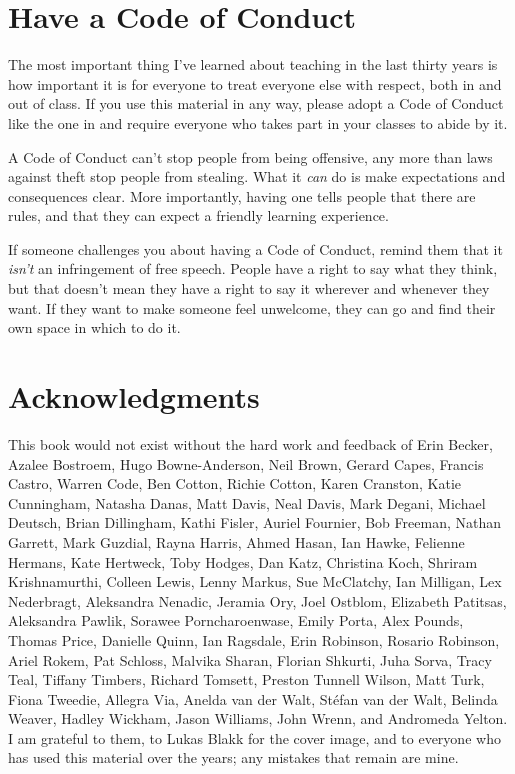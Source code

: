 \section{Have a Code of Conduct}\label{s:intro-code-of-conduct}

The most important thing I've learned about teaching in the last
thirty years is how important it is for everyone to treat everyone
else with respect, both in and out of class.  If you use this material
in any way, please adopt a Code of Conduct like the one in
 and require everyone who takes part in your classes
to abide by it.

A Code of Conduct can't stop people from being offensive, any more
than laws against theft stop people from stealing.  What it \emph{can}
do is make expectations and consequences clear.  More importantly,
having one tells people that there are rules, and that they can expect
a friendly learning experience.

If someone challenges you about having a Code of Conduct, remind them
that it \emph{isn't} an infringement of free speech.  People have a
right to say what they think, but that doesn't mean they have a right
to say it wherever and whenever they want.  If they want to make
someone feel unwelcome, they can go and find their own space in which
to do it.

\section{Acknowledgments}\label{s:intro-acknowledgments}

This book would not exist without the hard work and feedback of Erin
Becker, Azalee Bostroem, Hugo Bowne-Anderson, Neil Brown, Gerard
Capes, Francis Castro, Warren Code, Ben Cotton, Richie Cotton, Karen
Cranston, Katie Cunningham, Natasha Danas, Matt Davis, Neal Davis,
Mark Degani, Michael Deutsch, Brian Dillingham, Kathi Fisler, Auriel
Fournier, Bob Freeman, Nathan Garrett, Mark Guzdial, Rayna Harris,
Ahmed Hasan, Ian Hawke, Felienne Hermans, Kate Hertweck, Toby Hodges,
Dan Katz, Christina Koch, Shriram Krishnamurthi, Colleen Lewis, Lenny
Markus, Sue McClatchy, Ian Milligan, Lex Nederbragt, Aleksandra
Nenadic, Jeramia Ory, Joel Ostblom, Elizabeth Patitsas, Aleksandra
Pawlik, Sorawee Porncharoenwase, Emily Porta, Alex Pounds, Thomas
Price, Danielle Quinn, Ian Ragsdale, Erin Robinson, Rosario Robinson,
Ariel Rokem, Pat Schloss, Malvika Sharan, Florian Shkurti, Juha Sorva,
Tracy Teal, Tiffany Timbers, Richard Tomsett, Preston Tunnell Wilson,
Matt Turk, Fiona Tweedie, Allegra Via, Anelda van der Walt, St\'{e}fan
van der Walt, Belinda Weaver, Hadley Wickham, Jason Williams, John
Wrenn, and Andromeda Yelton.  I am grateful to them, to Lukas Blakk
for the cover image, and to everyone who has used this material over
the years; any mistakes that remain are mine.

